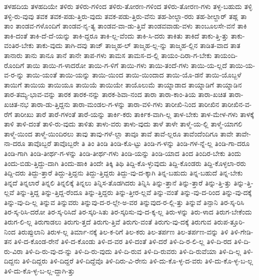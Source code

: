 {ತಳಹದಿಯ
ತಳಹದಿಯೇ
ತಳಿರು
ತಳಿರು-ಗಳಿಂದ
ತಳಿರು-ತೋರಣ-ಗಳಿಂದ
ತಳಿರು-ತೋರಣ-ಗಳು
ತಳ್ಳ-ಬಹುದು
ತಳ್ಳಿ
ತಳ್ಳಿ-ರು-ವುವು
ತವಕ
ತವಕ-ಪಡು-ತ್ತಿರು-ವುದು
ತವಕ-ಪಡು-ತ್ತಿರು-ವೆನು
ತಹ-ಶೀಲ್ದಾ-ರರು
ತಹ-ಶೀಲ್ದಾರ್
ತಹ್ಲ
ತಾ
ತಾಂ
ತಾಂಡವ-ಗಳೊಂದಿಗೆ
ತಾಂಡವ-ನೃ-ತ್ಯ
ತಾಂಡವ-ವಾ-ಡು-ತ್ತಿವೆ
ತಾಂಡವವಾಡು-ವಳು
ತಾಂಬೂಲಸೇ-ವನೆ
ತಾಕಿ
ತಾಕಿ-ದಂತೆ
ತಾಕಿ-ದೆ-ದೆ-ಯನ್ನು
ತಾಕಿ-ದ್ದರೂ
ತಾಕಿ-ಲ್ಲ-ವೆಂದು
ತಾಕಿ-ಸಿ-ದರು
ತಾಕಿತು
ತಾಕಿದೆ
ತಾಕು-ತ್ತಿ-ತ್ತು
ತಾಕು-ವಂತಿರ-ಬೇಕು
ತಾಕು-ವುದು
ತಾಗಿ-ದವು
ತಾಜ್
ತಾಜ್ಮಹ-ಲ್
ತಾಜ್ಮಹ-ಲ್ಲ-ನ್ನು
ತಾಜ್ಮಹ-ಲ್ಲಿನ
ತಾಡಿತ-ವಾದ
ತಾತ
ತಾನಾರು
ತಾನು
ತಾನೂ
ತಾನೆ
ತಾನೇ
ತಾಪ-ಗಳು
ತಾಮಸ
ತಾಮಸ-ದ-ಲ್ಲಿ
ತಾಯಂ-ದಿರಾ-ಗ-ಬೇಕು
ತಾಯಂದಿ-ರೊಂದಿಗೆ
ತಾಯಿ
ತಾಯಿ-ಗ-ಳಾದರೋ
ತಾಯಿ-ಗ-ಳಿಗೆ
ತಾಯಿ-ಗಳು
ತಾಯಿ-ತಂದೆ-ಗಳು
ತಾಯಿ-ಯ-ಲ್ಲದೆ
ತಾಯಿ-ಯ-ವ-ರ-ನ್ನು
ತಾಯಿ-ಯಂತೆ
ತಾಯಿ-ಯನ್ನು
ತಾಯಿ-ಯಿಂದ
ತಾಯಿ-ಯಿಂದಾದ
ತಾಯಿ-ಯೊ-ಡನೆ
ತಾಯಿ-ಯೊಬ್ಬಳೆ
ತಾಯಿಗೆ
ತಾಯಿಯ
ತಾಯಿಯೂ
ತಾಯಿಯೆ
ತಾಯಿಯೇ
ತಾಯೊಲುಮೆ
ತಾಯ್ನಾಡಾದ
ತಾಯ್ನಾಡಿಗೆ
ತಾಯ್ನಾಡಿನ
ತಾರ-ತಮ್ಯ-ಭಾವ-ವನ್ನು
ತಾರಕ
ತಾರಕ-ನನ್ನು
ತಾರಕ-ಶಿವಾ-ನಂದ
ತಾರಾ
ತಾರಾ-ಕಾಂ-ತಿಯ
ತಾರಾ-ಖಚಿತ
ತಾರಾ-ಖಚಿತ-ನಭ
ತಾರಾ-ಡು-ತ್ತಿದ್ದನು
ತಾರಾ-ಮಂಡಲ-ಗ-ಳನ್ನು
ತಾರಾ-ವಳಿ-ಗಳು
ತಾರೀಖಿ-ನಿಂದ
ತಾರೀಖಿನ
ತಾರೀಖಿನ-ವ-ರೆಗೆ
ತಾರೀಖು
ತಾರೆ
ತಾರೆ-ಗಳಂತೆ
ತಾರೆ-ಯನ್ನು
ತಾರ್ಕಿ-ಕರು
ತಾರ್ಕಿಕ-ವಾಗಿ-ಲ್ಲ
ತಾಳ-ಬೇಕು
ತಾಳ-ಮೇಳ-ಗಳು
ತಾಳಕ್ಕೆ
ತಾಳಿ
ತಾಳಿ-ದಂತೆ
ತಾಳಿ-ರು-ವುದು
ತಾಳಿತು
ತಾಳು-ವರು
ತಾಳು-ವುದು
ತಾಳೆ
ತಾಳೇ
ತಾಳ್ಮೆ-ಯ-ಲ್ಲಿ
ತಾಳ್ಮೆ-ಯಾಗಲಿ
ತಾಳ್ಮೆ-ಯಿಂದ
ತಾಳ್ಮೆ-ಯಿಂದಿರಲು
ತಾವು
ತಾವು-ಗಳೆ-ಲ್ಲಾ
ತಾವೂ
ತಾವೆ
ತಾವೆ-ಲ್ಲರೂ
ತಾವೆಂದೆಂದಿಗೂ
ತಾವೇ
ತಾವೇ-ನಾ-ದರೂ
ತಾವೊಬ್ಬರೆ
ತಾವೊಬ್ಬರೇ
ತಿ
ತಿಂ
ತಿಂಡಿ
ತಿಂಡಿ-ಕೊ-ಟ್ಟು
ತಿಂಡಿ-ಗ-ಳನ್ನು
ತಿಂಡಿ-ಗಳ-ನ್ನೆ-ಲ್ಲ
ತಿಂಡಿ-ಗಾ-ದರೂ
ತಿಂಡಿ-ಗಾಗಿ
ತಿಂಡಿ-ತೀರ್ಥ-ಗ-ಳನ್ನು
ತಿಂಡಿ-ತೀರ್ಥ-ಗಳು
ತಿಂಡಿ-ಯನ್ನು
ತಿಂಡಿ-ಯಾದ
ತಿಂದ
ತಿಂದಿರ-ಬೇಕು
ತಿಂದು
ತಿಂದು-ಬಿಡು-ತ್ತಿದ್ದು-ದಾಗಿ
ತಿಂದು-ಹಾಕಿ
ತಿಂದೇ
ತಿಕ್ಕಿ
ತಿಥಿ
ತಿದ್ದಿ-ಕೊ-ಳ್ಳುವುದು
ತಿದ್ದಿ-ಕೊಂಡರು
ತಿದ್ದಿ-ಕೊಳ್ಳಲಾ-ರರು
ತಿದ್ದಿ-ದರು
ತಿದ್ದು-ತ್ತಾರೆ
ತಿದ್ದು-ತ್ತಿದ್ದನು
ತಿದ್ದು-ತ್ತಿದ್ದರು
ತಿದ್ದು-ವು-ದ-ಕ್ಕಾಗಿ
ತಿನ್ನ-ಬಹುದು
ತಿನ್ನ-ಬಹುದೆ
ತಿನ್ನ-ಬೇಕು
ತಿನ್ನದೆ
ತಿನ್ನಲಾರೆ
ತಿನ್ನಲಿ
ತಿನ್ನಲಿಕ್ಕೆ
ತಿನ್ನಲು
ತಿನ್ನಿಸ-ತೊಡಗಿದರು
ತಿನ್ನಿಸಿ
ತಿನ್ನು-ತ್ತಾನೆ
ತಿನ್ನು-ತ್ತಾರೆ
ತಿನ್ನು-ತ್ತಿ-ತ್ತು
ತಿನ್ನು-ತ್ತಿ-ಲ್ಲವೆ
ತಿನ್ನು-ತ್ತಿದ್ದ
ತಿನ್ನು-ತ್ತಿದ್ದ-ರೆಂದೂ
ತಿನ್ನು-ತ್ತಿದ್ದರು
ತಿನ್ನು-ತ್ತೀರ-ಲ್ಲವೆ
ತಿನ್ನು-ವಂತೆ
ತಿನ್ನು-ವು-ದ-ರಿಂದ
ತಿನ್ನು-ವು-ದಕ್ಕೆ
ತಿನ್ನು-ವು-ದಿ-ಲ್ಲ
ತಿನ್ನುವ
ತಿನ್ನುವರು
ತಿನ್ನುವು-ದ-ರ-ಲ್ಲೇ-ಅ-ವರ
ತಿನ್ನುವುದ-ರ-ಲ್ಲಿ-ತ್ತು
ತಿನ್ನುವೆ
ತಿನ್ಪಾನಿ
ತಿರ-ಸ್ಕ-ರಿಸಿ
ತಿರ-ಸ್ಕ-ರಿಸಿ-ದರೋ
ತಿರ-ಸ್ಕ-ರಿಸಿದೆ
ತಿರ-ಸ್ಕರಿ-ಸಿತು
ತಿರ-ಸ್ಕರಿಸು-ವು-ದ-ಕ್ಕ-ಲ್ಲ
ತಿರು-ಳನ್ನು
ತಿರು-ಳಾದ
ತಿರುಗ-ಬೇಕೆಂದು
ತಿರುಗ-ಲಿ-ಲ್ಲ
ತಿರುಗಾಡಲು
ತಿರುಗು-ತ್ತದೆ
ತಿರುಗು-ತ್ತಿವೆ
ತಿರುಗು-ವಂತೆ
ತಿರುಗು-ವು-ದಕ್ಕೆ
ತಿರುಗುವ
ತಿರುಪ-ತ್ತೂರಿ-ನಿಂದ
ತಿರುಪ್ಪುಲಾನಿ
ತಿರುಳ-ಲ್ಲ
ತಿರ್ಮಾ-ನಕ್ಕೆ
ತಿಲ-ಕ-ರಿಗೆ
ತಿಲ-ಕರು
ತಿಲ-ತರ್ಪಣ
ತಿಲ-ತರ್ಪಣ-ವನ್ನು
ತಿಳಿ
ತಿಳಿ-ಗೇಡಿ-ತನ
ತಿಳಿ-ದ-ಕೊಂಡ-ರೇನೆ
ತಿಳಿ-ದ-ಕೊಂಡು
ತಿಳಿ-ದ-ವರ
ತಿಳಿ-ದಂತೆ
ತಿಳಿ-ದರೆ
ತಿಳಿ-ದಿ-ರ-ಲಿ-ಲ್ಲ
ತಿಳಿ-ದಿ-ರದ
ತಿಳಿ-ದಿ-ರು-ವಿರಾ
ತಿಳಿ-ದಿ-ರು-ವು-ದ-ನ್ನು
ತಿಳಿ-ದಿ-ರು-ವುದು
ತಿಳಿ-ದಿ-ರುವ
ತಿಳಿ-ದಿ-ರುವರು
ತಿಳಿ-ದಿ-ರುವೆಯಾ
ತಿಳಿ-ದಿ-ಲ್ಲ
ತಿಳಿ-ದಿದ್ದನು
ತಿಳಿ-ದಿದ್ದರು
ತಿಳಿ-ದಿದ್ದರೆ
ತಿಳಿ-ದಿದ್ದೆವೊ
ತಿಳಿ-ದಿರು-ವಿ-ರೇನು
ತಿಳಿ-ದು-ಕೊ-ಳ್ಳ-ದ-ವರು
ತಿಳಿ-ದು-ಕೊ-ಳ್ಳ-ಬ-ಲ್ಲ
ತಿಳಿ-ದು-ಕೊ-ಳ್ಳ-ಬ-ಲ್ಲ-ದ್ದಾಗಿ-ತ್ತು
}
